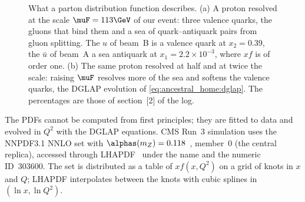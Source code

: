 \begin{figure}[htbp]\centering
\resizebox{\textwidth}{!}{}
\caption[What a parton distribution function describes]{What a parton distribution function describes. (a) A proton resolved at the scale $\muF=113\GeV$ of our event: three valence quarks, the gluons that bind them and a sea of quark--antiquark pairs from gluon splitting. The $u$ of beam~B is a valence quark at $x_2=0.39$, the $\bar u$ of beam~A a sea antiquark at $x_1=2.2\times10^{-3}$, where $xf$ is of order one. (b) The same proton resolved at half and at twice the scale: raising $\muF$ resolves more of the sea and softens the valence quarks, the DGLAP evolution of \cref{eq:ancestral_home:dglap}. The percentages are those of section~[2] of the  log.}
\label{fig:ancestral_home:proton_sketch}
\end{figure}

The PDFs cannot be computed from first principles; they are fitted to data
and evolved in $Q^2$ with the DGLAP equations. CMS Run~3 simulation uses the
NNPDF3.1 NNLO set with $\alphas(m_Z)=0.118$~\cite{NNPDF:2017mvq}, member~0
(the central replica), accessed through LHAPDF~\cite{Buckley:2014ana} under the
name  and the numeric ID~303600. The set is
distributed as a table of $x f(x,Q^2)$ on a grid of knots in $x$ and $Q$;
LHAPDF interpolates between the knots with cubic splines in $(\ln x,\ln Q^2)$.

